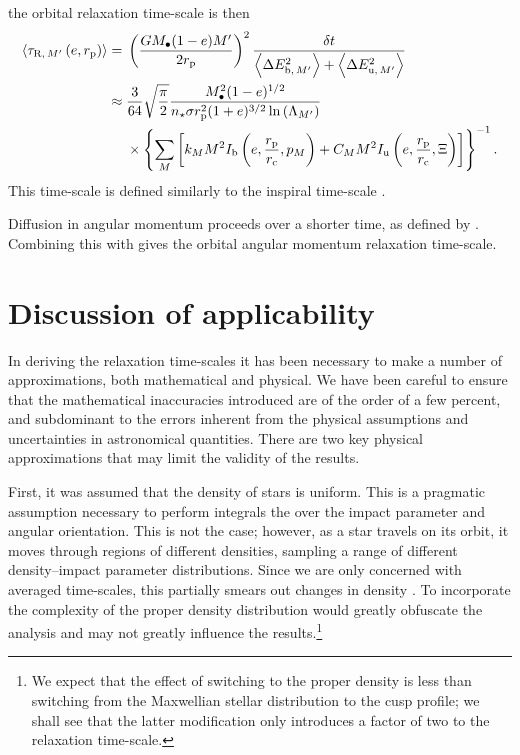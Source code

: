 the orbital relaxation time-scale is then
\begin{align}
\left\langle\tau_{\mathrm{R},\,M'}\left(e,r_\mathrm{p}\right)\right\rangle = {} & \left(\dfrac{GM_\bullet(1 - e)M'}{2r_\mathrm{p}}\right)^2\dfrac{\delta t}{\left\langle\Delta E^2_{\mathrm{b},\,M'}\right\rangle + \left\langle\Delta E^2_{\mathrm{u},\,M'}\right\rangle} \\
 \approx {} & \dfrac{3}{64}\sqrt{\dfrac{\pi}{2}} \dfrac{M_\bullet^2(1 - e)^{1/2}}{n_\star \sigma r_\mathrm{p}^2(1 + e)^{3/2}\ln\left(\Lambda_{M'}\right)} \nonumber \\*
 {} & \times \left\{\sum_M \left[ k_M M^2 I_\mathrm{b}\left(e,\dfrac{r_\mathrm{p}}{r_\mathrm{c}},p_M\right) + C_M M^2 I_\mathrm{u}\left(e,\dfrac{r_\mathrm{p}}{r_\mathrm{c}},\Xi\right)\right]\right\}^{-1}.
\label{eq:orbital-relax}
\end{align}
This time-scale is defined similarly to the inspiral time-scale .

Diffusion in angular momentum proceeds over a shorter time, as defined by . Combining this with  gives the orbital angular momentum relaxation time-scale.

\section{Discussion of applicability}

In deriving the relaxation time-scales it has been necessary to make a number of approximations, both mathematical and physical. We have been careful to ensure that the mathematical inaccuracies introduced are of the order of a few percent, and subdominant to the errors inherent from the physical assumptions and uncertainties in astronomical quantities. There are two key physical approximations that may limit the validity of the results.

First, it was assumed that the density of stars is uniform. This is a pragmatic assumption necessary to perform integrals the over the impact parameter and angular orientation. This is not the case; however, as a star travels on its orbit, it moves through regions of different densities, sampling a range of different density--impact parameter distributions. Since we are only concerned with averaged time-scales, this partially smears out changes in density \citep[cf.][]{Just2011}. To incorporate the complexity of the proper density distribution would greatly obfuscate the analysis and may not greatly influence the results.\footnote{We expect that the effect of switching to the proper density is less than switching from the Maxwellian stellar distribution to the cusp profile; we shall see that the latter modification only introduces a factor of two to the relaxation time-scale.}

